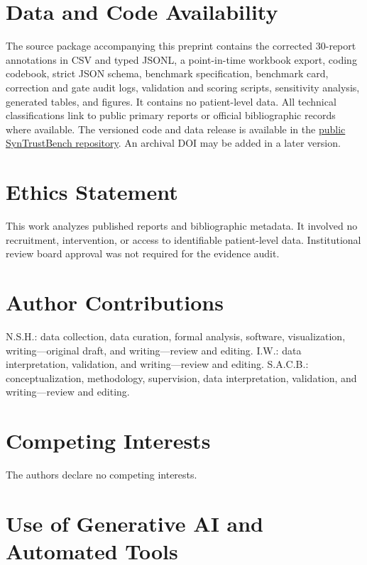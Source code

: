 \documentclass[11pt,letterpaper]{article}
\begin{document}
\section*{Data and Code Availability}

The source package accompanying this preprint contains the corrected 30-report annotations in CSV and typed JSONL, a point-in-time workbook export, coding codebook, strict JSON schema, benchmark specification, benchmark card, correction and gate audit logs, validation and scoring scripts, sensitivity analysis, generated tables, and figures. It contains no patient-level data. All technical classifications link to public primary reports or official bibliographic records where available. The versioned code and data release is available in the \href{https://github.com/neeamh/SynTrustBench-A-Trustworthiness-Evidence-Standard-for-Synthetic-Clinical-Data}{public SynTrustBench repository}. An archival DOI may be added in a later version.

\section*{Ethics Statement}

This work analyzes published reports and bibliographic metadata. It involved no recruitment, intervention, or access to identifiable patient-level data. Institutional review board approval was not required for the evidence audit.

\section*{Author Contributions}

N.S.H.: data collection, data curation, formal analysis, software, visualization, writing---original draft, and writing---review and editing. I.W.: data interpretation, validation, and writing---review and editing. S.A.C.B.: conceptualization, methodology, supervision, data interpretation, validation, and writing---review and editing.

\section*{Competing Interests}

The authors declare no competing interests.

\section*{Use of Generative AI and Automated Tools}
\end{document}

